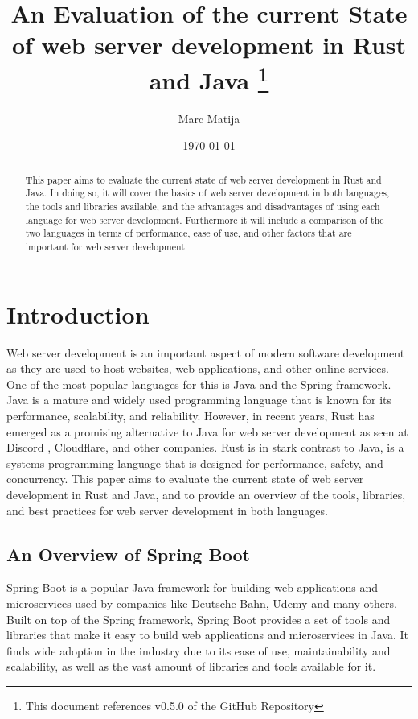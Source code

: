 \documentclass[a4paper,12pt]{article}
\title{An Evaluation of the current State of web server development in Rust and Java
\footnote{This document references v0.5.0 of the GitHub Repository}}
\author{Marc Matija}
\date{\today}
\begin{document}
	\maketitle
	\vspace{2cm}
	\begin{abstract}
		This paper aims to evaluate the current state of web server development in Rust and Java. 
		In doing so, it will cover the basics of web server development in both languages, the tools and libraries 
		available, and the advantages and disadvantages of using each language for web server development. 
		Furthermore it will include a comparison of the two languages in terms of performance, ease of 
		use, and other factors that are important for web server development. 
	\end{abstract}
	
	\newpage
	\tableofcontents
	\newpage
	
	\section{Introduction}
	\label{sec:introduction}
	Web server development is an important aspect of modern software development as they are 
	used to host websites, web applications, and other online services.
	One of the most popular languages for this is Java and the Spring framework.
	Java is a mature and widely used programming language that is known for its performance, scalability, and reliability.
	However, in recent years, Rust has emerged as a promising alternative to Java for web server development as seen at Discord 
	\cite{Discord}, Cloudflare\cite{Cloudflare_Pingora}, and other companies. 
	Rust is in stark contrast to Java, is a systems programming language that is designed for performance, safety, and concurrency.
	This paper aims to evaluate the current state of web server development in Rust and Java, and to provide an overview of 
	the tools, libraries, and best practices for web server development in both languages.
	
	\subsection{An Overview of Spring Boot}
	\label{subsec:spring_boot}
	Spring Boot is a popular Java framework for building web applications and microservices used by companies like 
	Deutsche Bahn\cite{DB_Job_Description}, Udemy \cite{Techstack_Udemy} and many others\cite{Spring_Boot_stackshare}.
	Built on top of the Spring framework, Spring Boot provides a set of tools and libraries that make it easy to build
	web applications and microservices in Java. It finds wide adoption in the industry due to its ease of use, maintainability 
	and scalability, as well as the vast amount of libraries and tools available for it.
\end{document}
